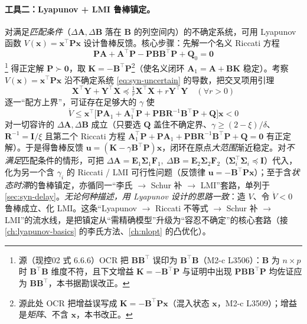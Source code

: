 \paragraph{工具二：Lyapunov + LMI 鲁棒镇定。}
对满足\emph{匹配条件}（$\Delta\mathbf A,\Delta\mathbf B$ 落在 $\mathbf B$ 的列空间内）的不确定系统，可用 Lyapunov 函数 $V(\mathbf x)=\mathbf x^\top\mathbf P\mathbf x$ 设计鲁棒反馈\cite{zhang2017modern}。核心步骤：先解一个名义 Riccati 方程
\begin{equation}
  \mathbf P\mathbf A+\mathbf A^\top\mathbf P-\mathbf P\mathbf B\mathbf B^\top\mathbf P+\mathbf Q_0=\mathbf 0
  \label{eq:syn-robust-riccati}
\end{equation}
\footnote{源（现控02 式 6.6.6）OCR 把 $\mathbf B\mathbf B^\top$ 误印为 $\mathbf B^\top\mathbf B$（M2-c L3506）：$\mathbf B$ 为 $n\times p$ 时 $\mathbf B^\top\mathbf B$ 维度不符，且下文增益 $\mathbf K=-\mathbf B^\top\mathbf P$ 与证明中出现 $\mathbf P\mathbf B\mathbf B^\top\mathbf P$ 均佐证应为 $\mathbf B\mathbf B^\top$，本书据勘误改正。}
得正定解 $\mathbf P\succ\mathbf 0$，取 $\mathbf K=-\mathbf B^\top\mathbf P$\footnote{源此处 OCR 把增益误写成 $\mathbf K=-\mathbf B^\top\mathbf P\mathbf x$（混入状态 $\mathbf x$，M2-c L3509）；增益是\emph{矩阵}、不含 $\mathbf x$，本书改正。}（使名义闭环 $\mathbf A_1=\mathbf A+\mathbf B\mathbf K$ 稳定）。考察 $V(\mathbf x)=\mathbf x^\top\mathbf P\mathbf x$ 沿不确定系统 \cref{eq:syn-uncertain} 的导数，把交叉项用引理
\begin{equation}
  \mathbf X^\top\mathbf Y+\mathbf Y^\top\mathbf X\preceq\tfrac1r\mathbf X^\top\mathbf X+r\mathbf Y^\top\mathbf Y\quad(\forall r>0)
  \label{eq:syn-young}
\end{equation}
逐一“配方上界”，可证存在足够大的 $\gamma$ 使
\begin{equation}
  \dot V\le\mathbf x^\top\big[\mathbf P\mathbf A_1+\mathbf A_1^\top\mathbf P+\mathbf P\mathbf B\mathbf R^{-1}\mathbf B^\top\mathbf P+\mathbf Q\big]\mathbf x<0
  \label{eq:syn-robust-vdot}
\end{equation}
对一切容许的 $\Delta\mathbf A,\Delta\mathbf B$ 成立（只要选 $\mathbf Q$ 盖住不确定界、$\gamma\ge(2-\xi)/\delta$、$\mathbf R^{-1}=\mathbf I/\xi$ 且第二个 Riccati 方程 $\mathbf A_1^\top\mathbf P+\mathbf P\mathbf A_1+\mathbf P\mathbf B\mathbf R^{-1}\mathbf B^\top\mathbf P+\mathbf Q=\mathbf 0$ 有正定解\cite{zhang2017modern}）。于是得鲁棒反馈 $\mathbf u=(\mathbf K-\gamma\mathbf B^\top\mathbf P)\mathbf x$，闭环在原点\emph{大范围}渐近稳定。对\emph{不满足}匹配条件的情形，可把 $\Delta\mathbf A=\mathbf E_1\boldsymbol\Sigma_1\mathbf F_1,\ \Delta\mathbf B=\mathbf E_2\boldsymbol\Sigma_2\mathbf F_2$（$\boldsymbol\Sigma_i^\top\boldsymbol\Sigma_i\preceq\mathbf I$）代入，化为另一个含 $\gamma_i$ 的 Riccati / LMI 可行性问题（反馈律 $\mathbf u=-\mathbf B^\top\mathbf P\mathbf x$）；至于含\emph{状态时滞}的鲁棒镇定，亦循同一“李氏 $\to$ Schur 补 $\to$ LMI”套路，单列于 \cref{sec:syn-delay}。\emph{无论何种描述，用 Lyapunov 设计的思路一致}：造 $V$、令 $\dot V<0$ 鲁棒成立、化 LMI。这条“Lyapunov $\to$ Riccati 不等式 $\to$ Schur 补 $\to$ LMI”的流水线，是把镇定从“需精确模型”升级为“容忍不确定”的核心套路（接 \cref{ch:lyapunov-basics} 的李氏方法、\cref{ch:nlopt} 的凸优化）。

